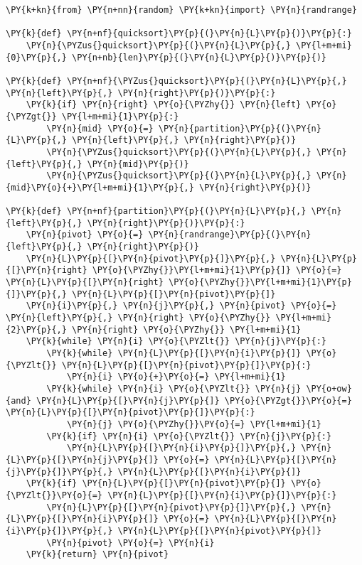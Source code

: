 \begin{Verbatim}[commandchars=\\\{\}]
\PY{k+kn}{from} \PY{n+nn}{random} \PY{k+kn}{import} \PY{n}{randrange}

\PY{k}{def} \PY{n+nf}{quicksort}\PY{p}{(}\PY{n}{L}\PY{p}{)}\PY{p}{:}
    \PY{n}{\PYZus{}quicksort}\PY{p}{(}\PY{n}{L}\PY{p}{,} \PY{l+m+mi}{0}\PY{p}{,} \PY{n+nb}{len}\PY{p}{(}\PY{n}{L}\PY{p}{)}\PY{p}{)}

\PY{k}{def} \PY{n+nf}{\PYZus{}quicksort}\PY{p}{(}\PY{n}{L}\PY{p}{,} \PY{n}{left}\PY{p}{,} \PY{n}{right}\PY{p}{)}\PY{p}{:}
    \PY{k}{if} \PY{n}{right} \PY{o}{\PYZhy{}} \PY{n}{left} \PY{o}{\PYZgt{}} \PY{l+m+mi}{1}\PY{p}{:}    
        \PY{n}{mid} \PY{o}{=} \PY{n}{partition}\PY{p}{(}\PY{n}{L}\PY{p}{,} \PY{n}{left}\PY{p}{,} \PY{n}{right}\PY{p}{)}
        \PY{n}{\PYZus{}quicksort}\PY{p}{(}\PY{n}{L}\PY{p}{,} \PY{n}{left}\PY{p}{,} \PY{n}{mid}\PY{p}{)}
        \PY{n}{\PYZus{}quicksort}\PY{p}{(}\PY{n}{L}\PY{p}{,} \PY{n}{mid}\PY{o}{+}\PY{l+m+mi}{1}\PY{p}{,} \PY{n}{right}\PY{p}{)}

\PY{k}{def} \PY{n+nf}{partition}\PY{p}{(}\PY{n}{L}\PY{p}{,} \PY{n}{left}\PY{p}{,} \PY{n}{right}\PY{p}{)}\PY{p}{:}
    \PY{n}{pivot} \PY{o}{=} \PY{n}{randrange}\PY{p}{(}\PY{n}{left}\PY{p}{,} \PY{n}{right}\PY{p}{)}
    \PY{n}{L}\PY{p}{[}\PY{n}{pivot}\PY{p}{]}\PY{p}{,} \PY{n}{L}\PY{p}{[}\PY{n}{right} \PY{o}{\PYZhy{}}\PY{l+m+mi}{1}\PY{p}{]} \PY{o}{=} \PY{n}{L}\PY{p}{[}\PY{n}{right} \PY{o}{\PYZhy{}}\PY{l+m+mi}{1}\PY{p}{]}\PY{p}{,} \PY{n}{L}\PY{p}{[}\PY{n}{pivot}\PY{p}{]}
    \PY{n}{i}\PY{p}{,} \PY{n}{j}\PY{p}{,} \PY{n}{pivot} \PY{o}{=} \PY{n}{left}\PY{p}{,} \PY{n}{right} \PY{o}{\PYZhy{}} \PY{l+m+mi}{2}\PY{p}{,} \PY{n}{right} \PY{o}{\PYZhy{}} \PY{l+m+mi}{1}
    \PY{k}{while} \PY{n}{i} \PY{o}{\PYZlt{}} \PY{n}{j}\PY{p}{:}
        \PY{k}{while} \PY{n}{L}\PY{p}{[}\PY{n}{i}\PY{p}{]} \PY{o}{\PYZlt{}} \PY{n}{L}\PY{p}{[}\PY{n}{pivot}\PY{p}{]}\PY{p}{:}
            \PY{n}{i} \PY{o}{+}\PY{o}{=} \PY{l+m+mi}{1}
        \PY{k}{while} \PY{n}{i} \PY{o}{\PYZlt{}} \PY{n}{j} \PY{o+ow}{and} \PY{n}{L}\PY{p}{[}\PY{n}{j}\PY{p}{]} \PY{o}{\PYZgt{}}\PY{o}{=} \PY{n}{L}\PY{p}{[}\PY{n}{pivot}\PY{p}{]}\PY{p}{:}
            \PY{n}{j} \PY{o}{\PYZhy{}}\PY{o}{=} \PY{l+m+mi}{1}
        \PY{k}{if} \PY{n}{i} \PY{o}{\PYZlt{}} \PY{n}{j}\PY{p}{:}
            \PY{n}{L}\PY{p}{[}\PY{n}{i}\PY{p}{]}\PY{p}{,} \PY{n}{L}\PY{p}{[}\PY{n}{j}\PY{p}{]} \PY{o}{=} \PY{n}{L}\PY{p}{[}\PY{n}{j}\PY{p}{]}\PY{p}{,} \PY{n}{L}\PY{p}{[}\PY{n}{i}\PY{p}{]}
    \PY{k}{if} \PY{n}{L}\PY{p}{[}\PY{n}{pivot}\PY{p}{]} \PY{o}{\PYZlt{}}\PY{o}{=} \PY{n}{L}\PY{p}{[}\PY{n}{i}\PY{p}{]}\PY{p}{:}
        \PY{n}{L}\PY{p}{[}\PY{n}{pivot}\PY{p}{]}\PY{p}{,} \PY{n}{L}\PY{p}{[}\PY{n}{i}\PY{p}{]} \PY{o}{=} \PY{n}{L}\PY{p}{[}\PY{n}{i}\PY{p}{]}\PY{p}{,} \PY{n}{L}\PY{p}{[}\PY{n}{pivot}\PY{p}{]}
        \PY{n}{pivot} \PY{o}{=} \PY{n}{i}
    \PY{k}{return} \PY{n}{pivot}
\end{Verbatim}
